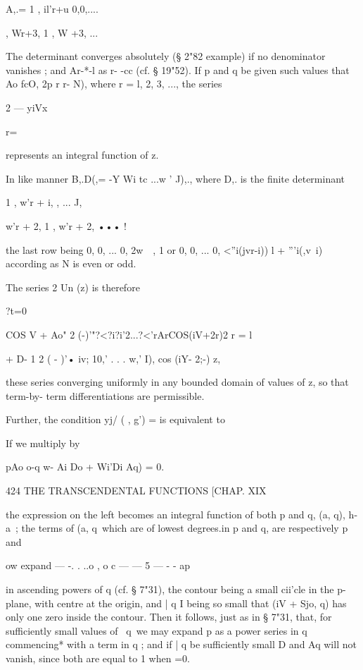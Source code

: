 {{A,.= 1 , il'r+u 0,0,.... 

, Wr+3, 1 , W +3, ... 

The determinant converges absolutely (§ 2"82 example) if no denominator vanishes ; 
and Ar-*-l as r- -cc (cf. § 19"52). If p and q be given such values that Ao fcO, 
2p r r- N), where r = l, 2, 3, ..., the series 

2   — yiVx%

r=\ 

represents an integral function of z. 

In like manner B,.D(,=  -Y Wi tc  ...w ' J),., where D,. is the finite determinant 

1 , w'r + i, , ... J, 

w'r + 2, 1 , w'r + 2, ••• ! 



the last row being 0, 0, ... 0, 2w\ \  , 1 or 0, 0, ... 0,  <''i(jvr-i)) l +  '''i(,v\ i) according as 
N is even or odd. 

The series 2 Un (z) is therefore 

?t=0 

COS V  + Ao"  2 (-)'"?<?i?i'2...?<'rArCOS(iV+2r)2 
r = l 

+ D- 1 2 ( - )'• iv; 10,' . . . w,' I), cos (iY- 2;-) z, 

these series converging uniformly in any bounded domain of values of z, so that term-by- 
term differentiations are permissible. 

Further, the condition yj/ ( , g') = is equivalent to 



If we multiply by 



pAo o-q  w-  Ai Do + Wi'Di Aq) = 0. 



424 THE TRANSCENDENTAL FUNCTIONS [CHAP. XIX 

the expression on the left becomes an integral function of both p and q,   (a, q), h-a\ ; the 
terms of   (a, q\ which are of lowest degrees.in p and q, are respectively p and 



 ow expand — -.   . ..o , o c —   — 5 —  - -  ap 



in ascending powers of q (cf. § 7"31), the contour being a small cii'cle in the p-plane, with 
centre at the origin, and | q I being so small that   (iV  + Sjo, q) has only one zero inside the 
contour. Then it follows, just as in § 7"31, that, for sufficiently small values of \ q\, 
we may expand p as a power series in q commencing* with a term in q ; and if | q 
be sufficiently small D  and Aq will not vanish, since both are equal to 1 when  =0. 

}}
